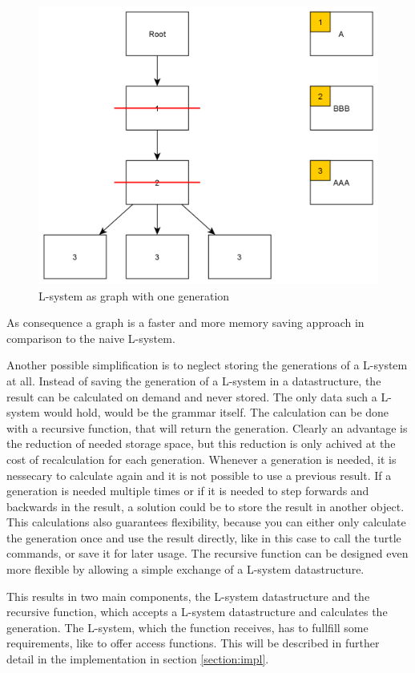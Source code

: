 \documentclass[english]{cpp-hmwk}
\begin{document}
\begin{figure}[h!]
	\centering
	\includegraphics[width=0.8\columnwidth]{../graphs/LSystem/examples/lsystem_graph_reduced2_example.png}
	\caption{L-system as graph with one generation}
	\label{figure:lsystem_graph_one_generation}
\end{figure}

\medskip
\noindent As consequence a graph is a faster and more memory saving approach in comparison to the naive L-system.

\bigskip

\noindent Another possible simplification is to neglect storing the generations of a L-system at all. Instead of saving the generation of a L-system in a datastructure, the result can be calculated on demand and never stored. The only data such a L-system would hold, would be the grammar itself. The calculation can be done with a recursive function, that will return the generation. Clearly an advantage is the reduction of needed storage space, but this reduction is only achived at the cost of recalculation for each generation. Whenever a generation is needed, it is nessecary to calculate again and it is not possible to use a previous result.
If a generation is needed multiple times or if it is needed to step forwards and backwards in the result, a solution could be to store the result in another object. This calculations also guarantees flexibility, because you can either only calculate the generation once and use the result directly, like in this case to call the turtle commands, or save it for later usage. The recursive function can be designed even more flexible by allowing a simple exchange of a L-system datastructure.

This results in two main components, the L-system datastructure and the recursive function, which accepts a L-system datastructure and calculates the generation. The L-system, which the function receives, has to fullfill some requirements, like to offer access functions. This will be described in further detail in the implementation in section \ref{section:impl}.
 
\end{document}
